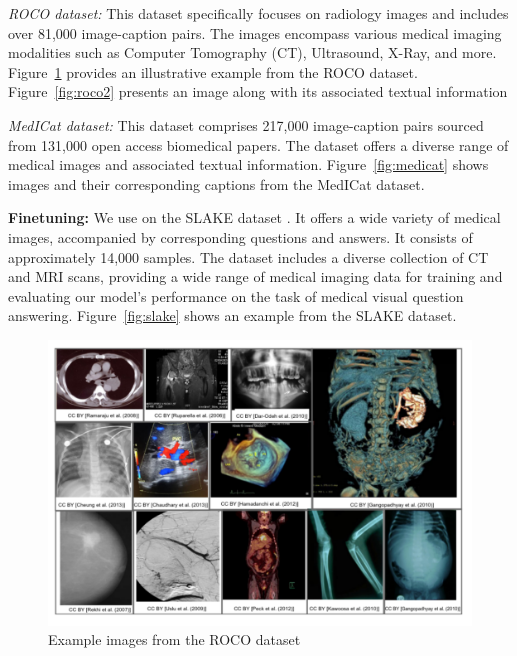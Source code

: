 {\it ROCO dataset:}
This dataset specifically focuses on radiology images and includes over 81,000 image-caption pairs. The images encompass various medical imaging modalities such as Computer Tomography (CT), Ultrasound, X-Ray, and more. Figure~\ref{fig:roco} provides an illustrative example from the ROCO dataset. Figure~\ref{fig:roco2} presents an image along with its associated textual information

{\it MedICat dataset:}
This dataset comprises 217,000 image-caption pairs sourced from 131,000 open access biomedical papers. The dataset offers a diverse range of medical images and associated textual information. Figure~\ref{fig:medicat} shows images and their corresponding captions from the MedICat dataset.
 
{\bf Finetuning:} We use on the SLAKE dataset \cite{liu2021slake}. It offers a wide variety of medical images, accompanied by corresponding questions and answers. It consists of approximately 14,000 samples. The dataset includes a diverse collection of CT and MRI scans, providing a wide range of medical imaging data for training and evaluating our model's performance on the task of medical visual question answering. Figure~\ref{fig:slake} shows an example from the SLAKE dataset.

\begin{figure}[t]
\begin{center}
\includegraphics[width=1.0\linewidth]{Chapter_3/chap3_ROCO.png}
\end{center}
   \caption{Example images from the ROCO dataset
}
\label{fig:roco}
\end{figure}

